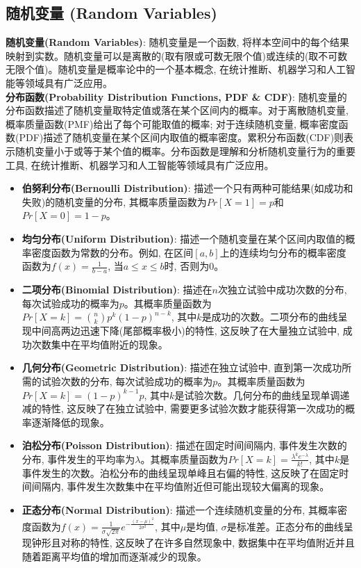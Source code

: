 \documentclass[12pt, a4paper, UTF8]{ctexart}
\newcommand{\term}[1]{\textbf{\textcolor{blue!80!black}{#1}}}
\begin{document}
\begin{sloppypar}
    \subsection{随机变量 (Random Variables)}
    \term{随机变量(Random Variables)}: 随机变量是一个函数, 将样本空间中的每个结果映射到实数。随机变量可以是离散的(取有限或可数无限个值)或连续的(取不可数无限个值)。随机变量是概率论中的一个基本概念, 在统计推断、机器学习和人工智能等领域具有广泛应用。\\
    \term{分布函数(Probability Distribution Functions, PDF \& CDF)}: 随机变量的分布函数描述了随机变量取特定值或落在某个区间内的概率。对于离散随机变量, 概率质量函数(PMF)给出了每个可能取值的概率; 对于连续随机变量, 概率密度函数(PDF)描述了随机变量在某个区间内取值的概率密度。累积分布函数(CDF)则表示随机变量小于或等于某个值的概率。分布函数是理解和分析随机变量行为的重要工具, 在统计推断、机器学习和人工智能等领域具有广泛应用。
    \begin{itemize}[nosep]
        \item \term{伯努利分布(Bernoulli Distribution)}: 描述一个只有两种可能结果(如成功和失败)的随机变量的分布, 其概率质量函数为$Pr[X=1] = p$和$Pr[X=0] = 1-p$。
        \item \term{均匀分布(Uniform Distribution)}: 描述一个随机变量在某个区间内取值的概率密度函数为常数的分布。例如, 在区间$[a, b]$上的连续均匀分布的概率密度函数为$f(x) = \frac{1}{b-a}$, 当$a \leq x \leq b$时, 否则为0。
        \item \term{二项分布(Binomial Distribution)}: 描述在$n$次独立试验中成功次数的分布, 每次试验成功的概率为$p$。其概率质量函数为$Pr[X=k] = \binom{n}{k} p^k (1-p)^{n-k}$, 其中$k$是成功的次数。二项分布的曲线呈现中间高两边迅速下降(尾部概率极小)的特性, 这反映了在大量独立试验中, 成功次数集中在平均值附近的现象。
        \item \term{几何分布(Geometric Distribution)}: 描述在独立试验中, 直到第一次成功所需的试验次数的分布, 每次试验成功的概率为$p$。其概率质量函数为$Pr[X=k] = (1-p)^{k-1} p$, 其中$k$是试验次数。几何分布的曲线呈现单调递减的特性, 这反映了在独立试验中, 需要更多试验次数才能获得第一次成功的概率逐渐降低的现象。
        \item \term{泊松分布(Poisson Distribution)}: 描述在固定时间间隔内, 事件发生次数的分布, 事件发生的平均率为$\lambda$。其概率质量函数为$Pr[X=k] = \frac{\lambda^k e^{-\lambda}}{k!}$, 其中$k$是事件发生的次数。泊松分布的曲线呈现单峰且右偏的特性, 这反映了在固定时间间隔内, 事件发生次数集中在平均值附近但可能出现较大偏离的现象。
        \item \term{正态分布(Normal Distribution)}: 描述一个连续随机变量的分布, 其概率密度函数为$f(x) = \frac{1}{\sigma \sqrt{2\pi}} e^{-\frac{(x-\mu)^2}{2\sigma^2}}$, 其中$\mu$是均值, $\sigma$是标准差。正态分布的曲线呈现钟形且对称的特性, 这反映了在许多自然现象中, 数据集中在平均值附近并且随着距离平均值的增加而逐渐减少的现象。

\end{itemize}
\end{sloppypar}
\end{document}
